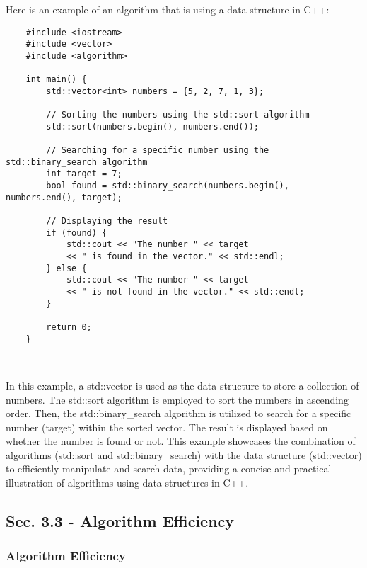 \begin{solution}
    Here is an example of an algorithm that is using a data structure in C++: \\
    \horizontalline
    \begin{verbatim}
    #include <iostream>
    #include <vector>
    #include <algorithm>
    
    int main() {
        std::vector<int> numbers = {5, 2, 7, 1, 3};
        
        // Sorting the numbers using the std::sort algorithm
        std::sort(numbers.begin(), numbers.end());
        
        // Searching for a specific number using the std::binary_search algorithm
        int target = 7;
        bool found = std::binary_search(numbers.begin(), numbers.end(), target);
        
        // Displaying the result
        if (found) {
            std::cout << "The number " << target 
            << " is found in the vector." << std::endl;
        } else {
            std::cout << "The number " << target 
            << " is not found in the vector." << std::endl;
        }
        
        return 0;
    }        
    \end{verbatim} \\
    \horizontalline

    \noindent In this example, a std::vector is used as the data structure to store a collection of numbers. The std::sort algorithm is employed to sort the numbers in ascending order. Then, the std::binary\_search algorithm is utilized to search for a specific number (target) within the sorted vector. The result is displayed based on whether the number is found or not. This example showcases the combination of algorithms 
    (std::sort and std::binary\_search) with the data structure (std::vector) to efficiently manipulate and search data, providing a concise and practical illustration of algorithms using data structures in C++. \\
\end{solution}

\subsection*{Sec. 3.3 - Algorithm Efficiency}
\subsubsection*{Algorithm Efficiency}


